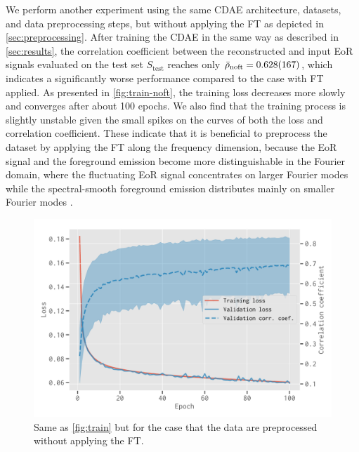 \documentclass[fleqn,usenatbib]{mnras}
\newcommand{\R}[1]{\mathrm{#1}}
\newcommand{\editone}[1]{{\leavevmode\color{cyan}#1}}
\newcommand{\edittwo}[1]{{\leavevmode\color{magenta}#1}}
\begin{document}
We perform another experiment using the same CDAE architecture,
datasets, and data preprocessing steps, \edittwo{but without}
applying the FT as depicted in \autoref{sec:preprocessing}.
After training the CDAE in the same way as described in
\autoref{sec:results}, \editone{the correlation coefficient between the
reconstructed and input EoR signals evaluated on the test set
$S_{\R{test}}$ reaches only $\bar{\rho}_{\R{noft}} = \num{0.628 +- 0.167}$,
which indicates a significantly worse performance compared to the case with
FT applied.
As presented in \autoref{fig:train-noft}, the training loss decreases more
slowly and converges after about 100 epochs.} %
We also find that the training process is slightly unstable given the small
spikes on the curves of both the loss and correlation coefficient.
These indicate that it is beneficial to preprocess the
dataset by applying the FT along the frequency dimension, because the
EoR signal and the foreground emission become more distinguishable
in the Fourier domain, where the fluctuating EoR signal concentrates on
larger Fourier modes while the spectral-smooth foreground emission
distributes mainly on smaller Fourier modes \citep[e.g.,][]{parsons2012}.

\begin{figure}
  \centering
  \includegraphics[width=\columnwidth]{cdae-train-noft}
  \caption{\label{fig:train-noft}%
    Same as \autoref{fig:train} but for the case that the data are
    preprocessed without applying the FT.
  }
\end{figure}
\end{document}
